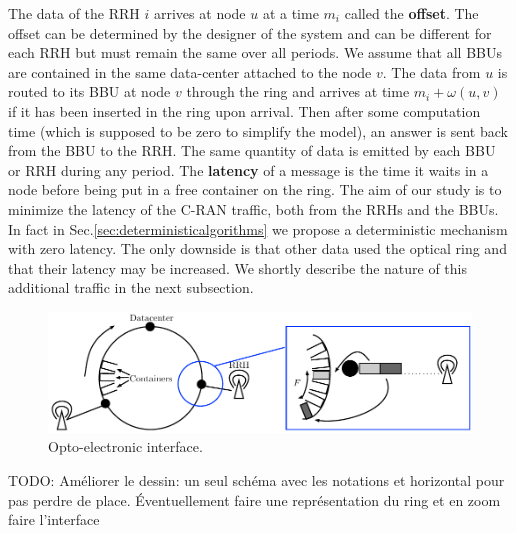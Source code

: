 \documentclass[]{algotel}
\newcommand{\todo}[1]{{\color{red} TODO: {#1}}}
\begin{document}
   The data of the RRH $i$ arrives at node $u$ at a time $m_i$ called the {\bf offset}. The offset can be determined 
   by the designer of the system and can be different for each RRH but must remain the same over all periods. We assume that all 
   BBUs are contained in the same data-center attached to the node $v$. The data from $u$ is routed to its BBU at node $v$ through the ring and arrives at time $m_i + \omega(u,v)$ if it has been inserted in the ring upon arrival. Then after some computation time (which is supposed to be zero to simplify the model), an answer is sent back from the BBU to the RRH. The same quantity of data is emitted by each BBU or RRH during any period.
   The {\bf latency} of a message is the time it waits in a node before being put in a free container on the ring.
   The aim of our study is to minimize the latency of the C-RAN traffic, both from the RRHs and the BBUs. 
   In fact in Sec.\ref{sec:deterministicalgorithms} we propose a deterministic mechanism with zero latency. 
   The only downside is that other data used the optical ring and that their latency may be increased. We shortly describe the
   nature of this additional traffic in the next subsection.
   
    
\begin{figure}[h!]
\begin{center}   

      \includegraphics[scale=0.8]{interface.pdf}
     \caption{Opto-electronic interface.}
     
\end{center}
  \end{figure}
  \todo{Améliorer le dessin: un seul schéma avec les notations et horizontal pour pas perdre de place.
  Éventuellement faire une représentation du ring et en zoom faire l'interface}
%   
%      
%  
   
\end{document}
